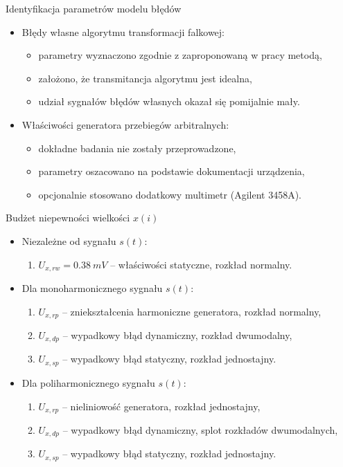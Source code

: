 \documentclass[12pt, polish, aspectratio = 169]{slides}
\begin{document}
\begin{frame}{Identyfikacja parametrów modelu błędów}
\begin{itemize}
\item Błędy własne algorytmu transformacji falkowej:
	\begin{itemize}
	\item parametry wyznaczono zgodnie z zaproponowaną w pracy metodą,
	\item założono, że transmitancja algorytmu jest idealna,
	\item udział sygnałów błędów własnych okazał się pomijalnie mały.
	\end{itemize}
\item Właściwości generatora przebiegów arbitralnych:
	\begin{itemize}
	\item dokładne badania nie zostały przeprowadzone,
	\item parametry oszacowano na podstawie dokumentacji urządzenia,
	\item opcjonalnie stosowano dodatkowy multimetr (Agilent 3458A).
	\end{itemize}
\end{itemize}
\end{frame}

\begin{frame}{Budżet niepewności wielkości $x(i)$}
\begin{itemize}
\item Niezależne od sygnału $s(t)$:
	\begin{enumerate}
	\item $U_{x,rw} = \qty{0.38}{mV}$ -- właściwości statyczne, rozkład normalny.
	\end{enumerate}
\item Dla monoharmonicznego sygnału $s(t)$:
	\begin{enumerate}
	\item $U_{x,rp}$ -- zniekształcenia harmoniczne generatora, rozkład normalny,
	\item $U_{x,dp}$ -- wypadkowy błąd dynamiczny, rozkład dwumodalny,
	\item $U_{x,sp}$ -- wypadkowy błąd statyczny, rozkład jednostajny.
	\end{enumerate}
\item Dla poliharmonicznego sygnału $s(t)$:
	\begin{enumerate}
	\item $U_{x,rp}$ -- nieliniowość generatora, rozkład jednostajny,
	\item $U_{x,dp}$ -- wypadkowy błąd dynamiczny, splot rozkładów dwumodalnych,
	\item $U_{x,sp}$ -- wypadkowy błąd statyczny, rozkład jednostajny.
	\end{enumerate}
\end{itemize}
\end{frame}
\end{document}
